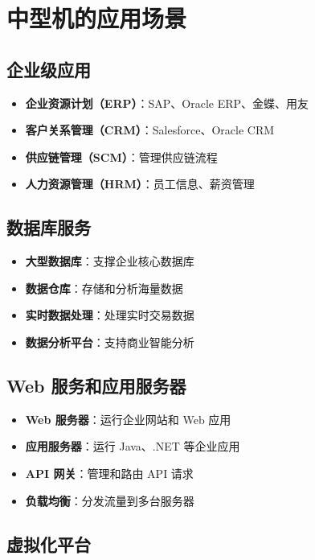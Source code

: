 \documentclass[12pt,UTF8]{ctexbook}
\begin{document}
\chapter{中型机的应用场景}
\label{chap:applications}

\section{企业级应用}

\begin{itemize}[leftmargin=2cm]
    \item \textbf{企业资源计划（ERP）}：SAP、Oracle ERP、金蝶、用友
    \item \textbf{客户关系管理（CRM）}：Salesforce、Oracle CRM
    \item \textbf{供应链管理（SCM）}：管理供应链流程
    \item \textbf{人力资源管理（HRM）}：员工信息、薪资管理
\end{itemize}

\section{数据库服务}

\begin{itemize}[leftmargin=2cm]
    \item \textbf{大型数据库}：支撑企业核心数据库
    \item \textbf{数据仓库}：存储和分析海量数据
    \item \textbf{实时数据处理}：处理实时交易数据
    \item \textbf{数据分析平台}：支持商业智能分析
\end{itemize}

\section{Web 服务和应用服务器}

\begin{itemize}[leftmargin=2cm]
    \item \textbf{Web 服务器}：运行企业网站和 Web 应用
    \item \textbf{应用服务器}：运行 Java、.NET 等企业应用
    \item \textbf{API 网关}：管理和路由 API 请求
    \item \textbf{负载均衡}：分发流量到多台服务器
\end{itemize}

\section{虚拟化平台}
\end{document}
